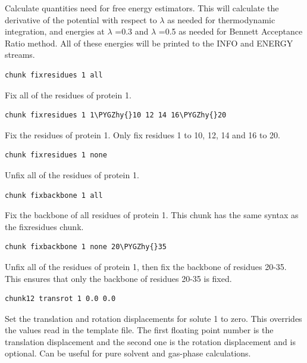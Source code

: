 \documentclass[letterpaper,10pt,english]{sphinxmanual}
\def\PYGZhy{\char`\-}
\begin{document}
Calculate quantities need for free energy estimators. This will calculate the derivative of the potential with respect to \(\lambda\) as needed for thermodynamic integration, and energies at \(\lambda\) =0.3 and \(\lambda\) =0.5 as needed for Bennett Acceptance Ratio method. All of these energies will be printed to the INFO and ENERGY streams.

\begin{Verbatim}[commandchars=\\\{\}]
chunk fixresidues 1 all
\end{Verbatim}

Fix all of the residues of protein 1.

\begin{Verbatim}[commandchars=\\\{\}]
chunk fixresidues 1 1\PYGZhy{}10 12 14 16\PYGZhy{}20
\end{Verbatim}

Fix the residues of protein 1. Only fix residues 1 to 10, 12, 14 and 16 to 20.

\begin{Verbatim}[commandchars=\\\{\}]
chunk fixresidues 1 none
\end{Verbatim}

Unfix all of the residues of protein 1.

\begin{Verbatim}[commandchars=\\\{\}]
chunk fixbackbone 1 all
\end{Verbatim}

Fix the backbone of all residues of protein 1. This chunk has the same syntax as the fixresidues chunk.

\begin{Verbatim}[commandchars=\\\{\}]
chunk fixbackbone 1 none 20\PYGZhy{}35
\end{Verbatim}

Unfix all of the residues of protein 1, then fix the backbone of residues 20-35. This ensures that only the backbone of residues 20-35 is fixed.

\begin{Verbatim}[commandchars=\\\{\}]
chunk12 transrot 1 0.0 0.0
\end{Verbatim}

Set the translation and rotation displacements for solute 1 to zero. This overrides the values read in the template file. The first floating point number is the translation displacement and the second one is the rotation displacement and is optional. Can be useful for pure solvent and gas-phase calculations.
\end{document}
